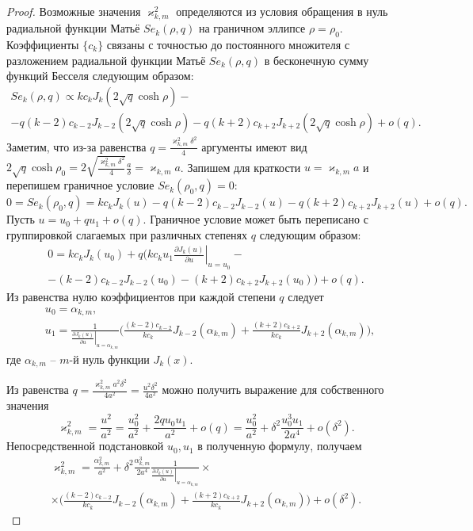 \begin{proof}
Возможные значения $\varkappa_{k,m}^2$ определяются из условия обращения в нуль радиальной функции Матьё $Se_k(\rho, q)$ на граничном эллипсе $\rho = \rho_0$.
Коэффициенты $\{c_k\}$ связаны \cite{wref2} с точностью до постоянного множителя с разложением радиальной функции Матьё $Se_k(\rho, q)$ в бесконечную сумму функций Бесселя следующим образом:
\begin{multline*}
Se_k(\rho, q) \propto 
	k c_k J_k(2\sqrt{q}\cosh{\rho}) - \\
	- q (k-2) c_{k-2} J_{k-2}(2\sqrt{q}\cosh{\rho}) -
	q (k+2) c_{k+2} J_{k+2}(2\sqrt{q}\cosh{\rho}) + o(q).
\end{multline*}
Заметим, что из-за равенства $q = \frac{\varkappa_{k,m}^2\delta^2}{4}$ аргументы имеют вид $2 \sqrt{q} \cosh{\rho_0} = 2 \sqrt{\frac{\varkappa_{k,m}^2 \delta^2}{4}} \frac{a}{\delta} = \varkappa_{k,m} a$. 
Запишем для краткости $u = \varkappa_{k,m} a$ и перепишем граничное условие $Se_k(\rho_0, q) = 0$:
$$0 = Se_k(\rho_0, q) =
	k c_k J_k(u) 
	- q (k-2) c_{k-2} J_{k-2}(u) -
	q (k+2) c_{k+2} J_{k+2}(u) + o(q).$$
Пусть $u = u_0 + q u_1 + o(q)$. Граничное условие может быть переписано с группировкой слагаемых при различных степенях $q$ следующим образом:
\begin{multline*}
0 =
	k c_k J_k(u_0) + q \biggl(
	k c_k u_1 \left.\frac{\partial  J_k(u)}{\partial u}\right|_{u=u_0} -\\
	-  (k-2) c_{k-2} J_{k-2}(u_0) - (k+2) c_{k+2} J_{k+2}(u_0) 
	\biggr)+ o(q).
\end{multline*}
Из равенства нулю коэффициентов при каждой степени $q$ следует
\begin{align*}
&u_0 = \alpha_{k, m}, \\
&u_1 = \frac{1}{\left.\frac{\partial J_{k} (u)}{\partial u}\right|_{u=\alpha_{k, m}}} 
\biggl(
\frac{(k-2)c_{k-2}}{k c_k} J_{k-2}(\alpha_{k, m}) + \frac{(k+2)c_{k+2} }{k c_k} J_{k+2}(\alpha_{k, m})
\biggr),
\end{align*}
где $\alpha_{k, m}$ -- $m$-й нуль функции $J_k(x)$.  

Из равенства $q=\frac{\varkappa_{k,m}^2 a^2 \delta^2}{4 a^2}=\frac{u^2 \delta^2}{4a^2}$ можно получить выражение для собственного значения
$$\varkappa_{k, m}^2 = \frac{u^2}{a^2} = \frac{u_0^2}{a^2} + \frac{2 q u_0 u_1}{a^2} + o(q)= \frac{u_0^2}{a^2} +  \delta^2 \frac{u_0^3 u_1}{2 a^4} + o(\delta^2).$$ 
Непосредственной подстановкой $u_0, u_1$ в полученную формулу, получаем
\begin{multline*}
\varkappa_{k, m}^2 = 
\frac{\alpha_{k, m}^2}{a^2} +  \delta^2 \frac{\alpha_{k, m}^3}{2 a^4}\frac{1}{\left.\frac{\partial J_{k} (u)}{\partial u}\right|_{u=\alpha_{k, m}}} \times \\ \times
\biggl(
\frac{(k-2)c_{k-2}}{k c_k} J_{k-2}(\alpha_{k, m}) + \frac{(k+2)c_{k+2} }{k c_k} J_{k+2}(\alpha_{k, m})
\biggr) + o(\delta^2).
\end{multline*}
\end{proof}

